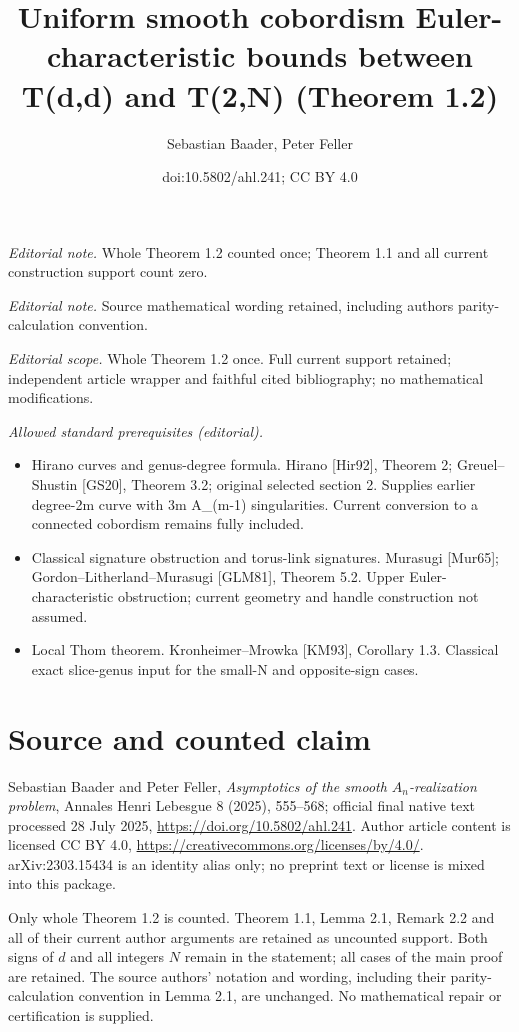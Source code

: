 \documentclass[10pt,a4paper]{article}
\title{Uniform smooth cobordism Euler-characteristic bounds between T(d,d) and T(2,N) (Theorem 1.2)}
\author{Sebastian Baader, Peter Feller}
\date{doi:10.5802/ahl.241; CC BY 4.0}
\theoremstyle{definition}
\numberwithin{equation}{section}
\begin{document}
\maketitle
\noindent\textit{Editorial note.} Whole Theorem 1.2 counted once; Theorem 1.1 and all current construction support count zero.\par\medskip
\noindent\textit{Editorial note.} Source mathematical wording retained, including authors parity-calculation convention.\par\medskip
\noindent\textit{Editorial scope.} Whole Theorem 1.2 once. Full current support retained; independent article wrapper and faithful cited bibliography; no mathematical modifications.\par\medskip
\noindent\textit{Allowed standard prerequisites (editorial).}\begin{itemize}
\item Hirano curves and genus-degree formula. Hirano [Hir92], Theorem 2; Greuel–Shustin [GS20], Theorem 3.2; original selected section 2. Supplies earlier degree-2m curve with 3m A\_(m-1) singularities. Current conversion to a connected cobordism remains fully included.
\item Classical signature obstruction and torus-link signatures. Murasugi [Mur65]; Gordon–Litherland–Murasugi [GLM81], Theorem 5.2. Upper Euler-characteristic obstruction; current geometry and handle construction not assumed.
\item Local Thom theorem. Kronheimer–Mrowka [KM93], Corollary 1.3. Classical exact slice-genus input for the small-N and opposite-sign cases.
\end{itemize}\medskip
\section*{Source and counted claim}
Sebastian Baader and Peter Feller, \emph{Asymptotics of the smooth $A_n$-realization problem}, Annales Henri Lebesgue 8 (2025), 555--568; official final native text processed 28 July 2025, \url{https://doi.org/10.5802/ahl.241}. Author article content is licensed CC BY 4.0, \url{https://creativecommons.org/licenses/by/4.0/}. arXiv:2303.15434 is an identity alias only; no preprint text or license is mixed into this package.

Only whole Theorem 1.2 is counted. Theorem 1.1, Lemma 2.1, Remark 2.2 and all of their current author arguments are retained as uncounted support. Both signs of $d$ and all integers $N$ remain in the statement; all cases of the main proof are retained. The source authors' notation and wording, including their parity-calculation convention in Lemma 2.1, are unchanged. No mathematical repair or certification is supplied.
\end{document}
